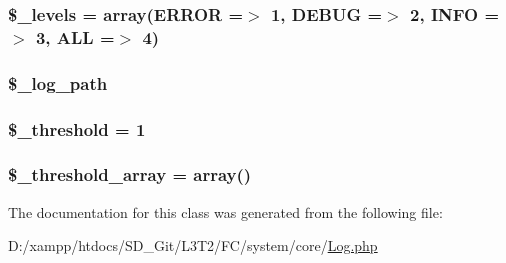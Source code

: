 \subsubsection[{\$\+\_\+levels}]{\setlength{\rightskip}{0pt plus 5cm}\$\+\_\+levels = array(\textquotesingle{}E\+R\+R\+O\+R\textquotesingle{} =$>$ 1, \textquotesingle{}D\+E\+B\+U\+G\textquotesingle{} =$>$ 2, \textquotesingle{}I\+N\+F\+O\textquotesingle{} =$>$ 3, \textquotesingle{}A\+L\+L\textquotesingle{} =$>$ 4)\hspace{0.3cm}{\ttfamily [protected]}}\label{class_c_i___log_aeb1c4747136537731b6cfed6f1e64941}
\hypertarget{class_c_i___log_a3eaf9e92941ee6be33bc972ab76b4caf}{}
\subsubsection[{\$\+\_\+log\+\_\+path}]{\setlength{\rightskip}{0pt plus 5cm}\$\+\_\+log\+\_\+path\hspace{0.3cm}{\ttfamily [protected]}}\label{class_c_i___log_a3eaf9e92941ee6be33bc972ab76b4caf}
\hypertarget{class_c_i___log_a0fc9914bdaf300fa9a1745201204e73f}{}
\subsubsection[{\$\+\_\+threshold}]{\setlength{\rightskip}{0pt plus 5cm}\$\+\_\+threshold = 1\hspace{0.3cm}{\ttfamily [protected]}}\label{class_c_i___log_a0fc9914bdaf300fa9a1745201204e73f}
\hypertarget{class_c_i___log_a95562d965f341c55d2c997ed12b4b721}{}
\subsubsection[{\$\+\_\+threshold\+\_\+array}]{\setlength{\rightskip}{0pt plus 5cm}\$\+\_\+threshold\+\_\+array = array()\hspace{0.3cm}{\ttfamily [protected]}}\label{class_c_i___log_a95562d965f341c55d2c997ed12b4b721}


The documentation for this class was generated from the following file\+:\begin{DoxyCompactItemize}
\item 
D\+:/xampp/htdocs/\+S\+D\+\_\+\+Git/\+L3\+T2/\+F\+C/system/core/\hyperlink{_log_8php}{Log.\+php}\end{DoxyCompactItemize}
